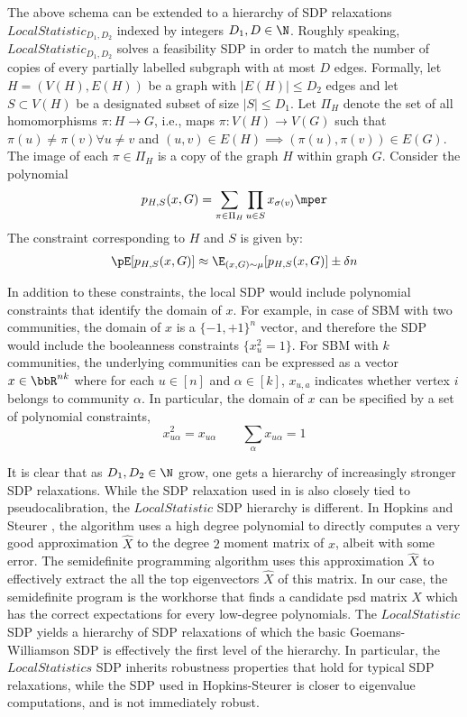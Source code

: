 The above schema can be extended to a hierarchy of SDP relaxations {\sc $LocalStatistic_{D_1,D_2}$} indexed by integers $D_1, D \in \N$.
%
Roughly speaking, $LocalStatistic_{D_1,D_2}$ solves a feasibility SDP in order to match the number of copies of every partially labelled subgraph with at most $D$ edges.
%
Formally, let $H = (V(H), E(H))$ be a graph with $|E(H)| \leq D_2$ edges and let $S \subset V(H)$ be a designated subset of size $|S| \leq D_1$.
%
Let $\Pi_H$ denote the set of all homomorphisms $\pi: H \to G$, i.e., maps $\pi: V(H) \to V(G)$ such that $\pi(u) \neq \pi(v) \forall u \neq v$ and $(u,v) \in E(H) \implies (\pi(u), \pi(v)) \in E(G)$.
%
The image of each $\pi \in \Pi_H$ is a copy of the graph $H$ within graph $G$.  
%
Consider the polynomial 
$$ p_{H,S}(x,G) = \sum_{\pi \in \Pi_H} \prod_{u \in S} x_{\sigma(v)} \mper $$
The constraint corresponding to $H$ and $S$ is given by:
\begin{align}
    \pE[ p_{H,S}(x,G)] \approx \E_{(x,G) \sim \mu} [p_{H,S}(x,G)] \pm \delta n
\end{align}
%

In addition to these constraints, the local SDP would include polynomial constraints that identify the domain of $x$.  For example, in case of SBM with two communities, the domain of $x$ is a $\{-1,+1\}^n$ vector, and therefore the SDP would include the booleanness constraints $\{x_u^2 = 1\}$. 
%
For SBM with $k$ communities, the underlying communities can be expressed as a vector $x \in \bbR^{nk}$ where for each $u \in [n]$ and $\alpha \in [k]$, $x_{u,a}$ indicates whether vertex $i$ belongs to community $\alpha$.  In particular, the domain of $x$ can be specified by a set of polynomial constraints,
$$ x_{u\alpha}^2 = x_{u\alpha} \qquad \sum_{\alpha} x_{u\alpha} = 1  $$

It is clear that as $D_1, D_2 \in \N$ grow, one gets a hierarchy of  increasingly stronger SDP relaxations.
%
While the SDP relaxation used in \cite{hopkins2017efficient} is also closely tied to pseudocalibration, the $LocalStatistic$ SDP hierarchy is different.  In Hopkins and Steurer \cite{hopkins2017efficient}, the algorithm uses a high degree polynomial to directly computes a very good approximation $\hat{X}$ to the degree $2$ moment matrix of $x$, albeit with some error.  
%
The semidefinite programming algorithm uses this approximation $\hat{X}$ to effectively extract the all the top eigenvectors $\hat{X}$ of this matrix.
%
In our case, the semidefinite program is the workhorse that finds a candidate psd matrix $X$ which has the correct expectations for every low-degree polynomials.
%
The $LocalStatistic$ SDP yields a hierarchy of SDP relaxations of which the basic Goemans-Williamson SDP is effectively the first level of the hierarchy.  
%
In particular, the $LocalStatistics$ SDP inherits robustness properties that hold for typical SDP relaxations, while the SDP used in Hopkins-Steurer \cite{hopkins2017efficient} is closer to eigenvalue computations, and is not immediately robust.



